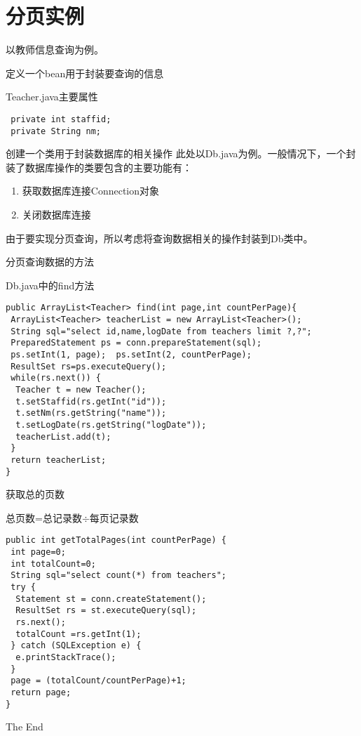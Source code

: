 \documentclass{beamer}
\begin{document}
\section{分页实例}
\begin{frame}
以教师信息查询为例。
\end{frame}
\begin{frame}[fragile]{定义一个bean用于封装要查询的信息}
\begin{block}{Teacher.java主要属性}
\begin{verbatim}
 private int staffid;
 private String nm;
\end{verbatim}
\end{block}

\end{frame}

\begin{frame}[fragile]{创建一个类用于封装数据库的相关操作}
此处以Db.java为例。一般情况下，一个封装了数据库操作的类要包含的主要功能有：
\begin{enumerate}
\item
获取数据库连接Connection对象
\item
关闭数据库连接
\end{enumerate}
由于要实现分页查询，所以考虑将查询数据相关的操作封装到Db类中。
\end{frame}

\begin{frame}[fragile]{分页查询数据的方法}
\begin{block}{Db.java中的find方法}
\begin{verbatim}
public ArrayList<Teacher> find(int page,int countPerPage){
 ArrayList<Teacher> teacherList = new ArrayList<Teacher>();
 String sql="select id,name,logDate from teachers limit ?,?";
 PreparedStatement ps = conn.prepareStatement(sql);
 ps.setInt(1, page);  ps.setInt(2, countPerPage);
 ResultSet rs=ps.executeQuery();
 while(rs.next()) {
  Teacher t = new Teacher();
  t.setStaffid(rs.getInt("id"));
  t.setNm(rs.getString("name"));
  t.setLogDate(rs.getString("logDate"));
  teacherList.add(t);
 }
 return teacherList;
}
\end{verbatim}
\end{block}
\end{frame}
\begin{frame}[fragile]{获取总的页数}

\begin{block}{总页数=总记录数$\div$每页记录数}
\begin{verbatim}
public int getTotalPages(int countPerPage) {
 int page=0;
 int totalCount=0;
 String sql="select count(*) from teachers";
 try {
  Statement st = conn.createStatement();
  ResultSet rs = st.executeQuery(sql);
  rs.next();
  totalCount =rs.getInt(1);
 } catch (SQLException e) {
  e.printStackTrace();
 }
 page = (totalCount/countPerPage)+1;
 return page;
}
\end{verbatim}
\end{block}
\end{frame}
\begin{frame}
\Huge{\centerline{The End}}
\end{frame}
\end{document}
